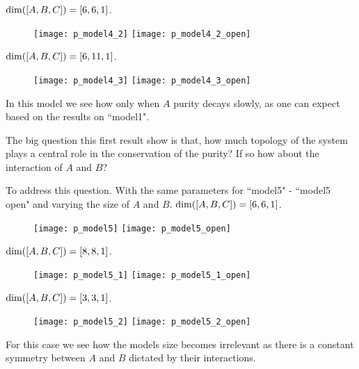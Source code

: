 \documentclass[floatfix]{article}
\newcommand*{\ud}{
\underline{\space\space}}
\begin{document}
${\rm dim}([A,B,C])=[6,6,1]$.

\begin{figure}[H]
\begin{center}
\texttt{[image: p\_model4\_2]}  
\texttt{[image: p\_model4\_2\_open]}  
\end{center}
\caption{}
\label{p_m4}
\end{figure}

${\rm dim}([A,B,C])=[6,11,1]$.

\begin{figure}[H]
\begin{center}
\texttt{[image: p\_model4\_3]}  
\texttt{[image: p\_model4\_3\_open]}  
\end{center}
\caption{}
\label{p_m4}
\end{figure}

In this model we see how only when $A$ purity decays slowly, as one can expect based on the results on ``model1".

The big question this first result show is that,  how much topology of the system plays a central role in the conservation of the purity? If so how about the interaction of $A$ and $B$?

To address this question.
With the same parameters for ``model5" - ``model5\ud open" and varying the size of $A$ and $B$.
${\rm dim}([A,B,C])=[6,6,1]$.

\begin{figure}[H]
\begin{center}
\texttt{[image: p\_model5]}  
\texttt{[image: p\_model5\_open]}  
\end{center}
\caption{}
\label{p_m4}
\end{figure}


${\rm dim}([A,B,C])=[8,8,1]$.

\begin{figure}[H]
\begin{center}
\texttt{[image: p\_model5\_1]}  
\texttt{[image: p\_model5\_1\_open]}  
\end{center}
\caption{}
\label{p_m4}
\end{figure}


${\rm dim}([A,B,C])=[3,3,1]$.

\begin{figure}[H]
\begin{center}
\texttt{[image: p\_model5\_2]}  
\texttt{[image: p\_model5\_2\_open]}  
\end{center}
\caption{}
\label{p_m4}
\end{figure}

For this case we see how the models size becomes irrelevant as there is a constant symmetry between $A$ and $B$ dictated by
their interactions.
\end{document}
